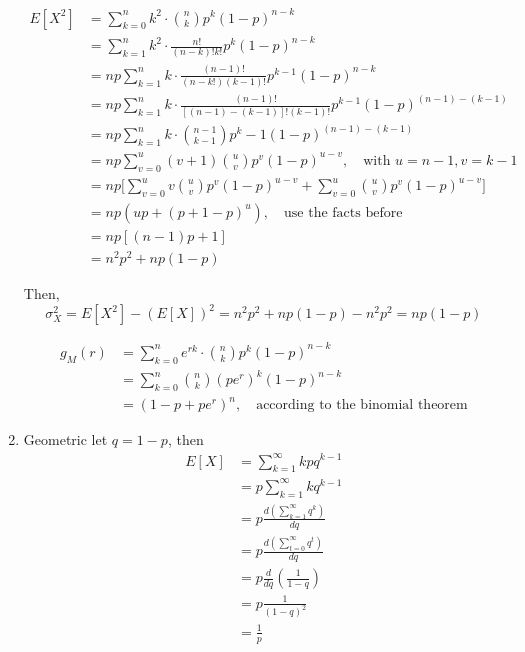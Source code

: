 \documentclass[UTF8]{article}
\begin{document}
\begin{enumerate}
        \begin{equation*}
            \begin{split}
                E[X^2] &= \sum^n_{k=0}k^2\cdot\binom{n}{k}p^k(1-p)^{n-k}\\
                &= \sum^n_{k=1}k^2\cdot\frac{n!}{(n-k)!k!}p^k(1-p)^{n-k}\\
                &= np\sum^n_{k=1}k\cdot\frac{(n-1)!}{(n-k!)(k-1)!}p^{k-1}(1-p)^{n-k}\\
                &=np\sum^n_{k=1}k\cdot\frac{(n-1)!}{[(n-1)-(k-1)]!(k-1)!}p^{k-1}(1-p)^{(n-1)-(k-1)}\\
                &=np\sum^n_{k=1}k\cdot\binom{n-1}{k-1}p^k-1(1-p)^{(n-1)-(k-1)}\\
                &=np\sum^u_{v=0}(v+1)\binom{u}{v}p^v(1-p)^{u-v},\quad\text{with $u=n-1,v=k-1$}\\
                &=np\bigg[\sum^u_{v=0}v\binom{u}{v}p^v(1-p)^{u-v}+\sum^u_{v=0}\binom{u}{v}p^v(1-p)^{u-v}\bigg]\\
                &=np(up+(p+1-p)^u),\quad\text{use the facts before}\\
                &=np[(n-1)p+1]\\
                &=n^2p^2+np(1-p)
            \end{split}
        \end{equation*}

        Then,
        \begin{equation*}
            \sigma^2_X=E[X^2]-(E[X])^2=n^2p^2+np(1-p)-n^2p^2=np(1-p)
        \end{equation*}

        \begin{equation*}
            \begin{split}
                g_M(r) &= \sum^n_{k=0}e^{rk}\cdot\binom{n}{k}p^k(1-p)^{n-k}\\
                &=\sum^n_{k=0}\binom{n}{k}(pe^r)^k(1-p)^{n-k}\\
                &=(1-p+pe^r)^n,\quad\text{according to the binomial theorem}
            \end{split}
        \end{equation*}

        \item Geometric
        let $q=1-p$, then 
        \begin{equation*}
            \begin{split}
                E[X] &=\sum^\infty_{k=1}kpq^{k-1}\\
                &=p\sum^\infty_{k=1}kq^{k-1}\\
                &=p\frac{d(\sum^\infty_{k=1}q^k)}{dq}\\
                &=p\frac{d(\sum^\infty_{t=0}q^t)}{dq}\\
                &=p\frac{d}{dq}(\frac{1}{1-q})\\
                &=p\frac{1}{(1-q)^2}\\
                &=\frac{1}{p}
            \end{split}
        \end{equation*}


\end{enumerate}
\end{document}
